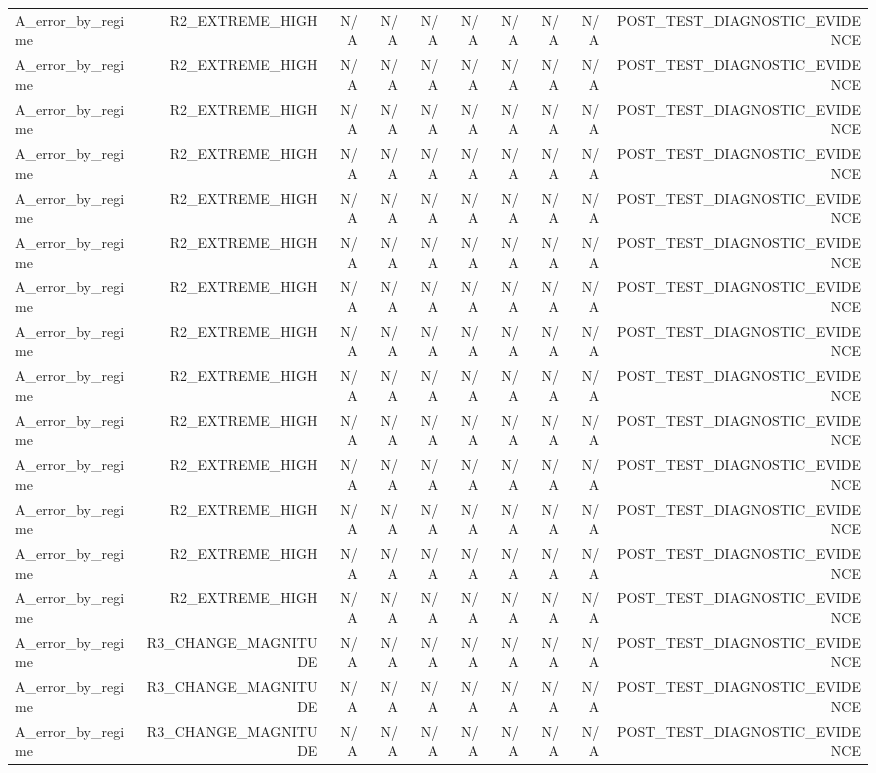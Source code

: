 \begin{table}[h!]
\begin{tabular}{lrrrrrrrrr}
A\_error\_by\_regime & R2\_EXTREME\_HIGH & N/A & N/A & N/A & N/A & N/A & N/A & N/A & POST\_TEST\_DIAGNOSTIC\_EVIDENCE \\
A\_error\_by\_regime & R2\_EXTREME\_HIGH & N/A & N/A & N/A & N/A & N/A & N/A & N/A & POST\_TEST\_DIAGNOSTIC\_EVIDENCE \\
A\_error\_by\_regime & R2\_EXTREME\_HIGH & N/A & N/A & N/A & N/A & N/A & N/A & N/A & POST\_TEST\_DIAGNOSTIC\_EVIDENCE \\
A\_error\_by\_regime & R2\_EXTREME\_HIGH & N/A & N/A & N/A & N/A & N/A & N/A & N/A & POST\_TEST\_DIAGNOSTIC\_EVIDENCE \\
A\_error\_by\_regime & R2\_EXTREME\_HIGH & N/A & N/A & N/A & N/A & N/A & N/A & N/A & POST\_TEST\_DIAGNOSTIC\_EVIDENCE \\
A\_error\_by\_regime & R2\_EXTREME\_HIGH & N/A & N/A & N/A & N/A & N/A & N/A & N/A & POST\_TEST\_DIAGNOSTIC\_EVIDENCE \\
A\_error\_by\_regime & R2\_EXTREME\_HIGH & N/A & N/A & N/A & N/A & N/A & N/A & N/A & POST\_TEST\_DIAGNOSTIC\_EVIDENCE \\
A\_error\_by\_regime & R2\_EXTREME\_HIGH & N/A & N/A & N/A & N/A & N/A & N/A & N/A & POST\_TEST\_DIAGNOSTIC\_EVIDENCE \\
A\_error\_by\_regime & R2\_EXTREME\_HIGH & N/A & N/A & N/A & N/A & N/A & N/A & N/A & POST\_TEST\_DIAGNOSTIC\_EVIDENCE \\
A\_error\_by\_regime & R2\_EXTREME\_HIGH & N/A & N/A & N/A & N/A & N/A & N/A & N/A & POST\_TEST\_DIAGNOSTIC\_EVIDENCE \\
A\_error\_by\_regime & R2\_EXTREME\_HIGH & N/A & N/A & N/A & N/A & N/A & N/A & N/A & POST\_TEST\_DIAGNOSTIC\_EVIDENCE \\
A\_error\_by\_regime & R2\_EXTREME\_HIGH & N/A & N/A & N/A & N/A & N/A & N/A & N/A & POST\_TEST\_DIAGNOSTIC\_EVIDENCE \\
A\_error\_by\_regime & R2\_EXTREME\_HIGH & N/A & N/A & N/A & N/A & N/A & N/A & N/A & POST\_TEST\_DIAGNOSTIC\_EVIDENCE \\
A\_error\_by\_regime & R2\_EXTREME\_HIGH & N/A & N/A & N/A & N/A & N/A & N/A & N/A & POST\_TEST\_DIAGNOSTIC\_EVIDENCE \\
A\_error\_by\_regime & R3\_CHANGE\_MAGNITUDE & N/A & N/A & N/A & N/A & N/A & N/A & N/A & POST\_TEST\_DIAGNOSTIC\_EVIDENCE \\
A\_error\_by\_regime & R3\_CHANGE\_MAGNITUDE & N/A & N/A & N/A & N/A & N/A & N/A & N/A & POST\_TEST\_DIAGNOSTIC\_EVIDENCE \\
A\_error\_by\_regime & R3\_CHANGE\_MAGNITUDE & N/A & N/A & N/A & N/A & N/A & N/A & N/A & POST\_TEST\_DIAGNOSTIC\_EVIDENCE \\

\end{tabular}
\end{table}
